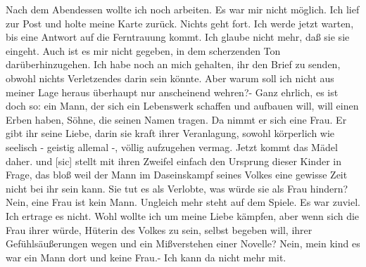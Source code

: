 \def\day{18 Mai 1944 18\begin{math}^{15}\end{math}}
\mktitle

Nach dem Abendessen wollte ich noch arbeiten.
Es war mir nicht m\"{o}glich.
Ich lief zur Post und holte meine Karte zur\"{u}ck.
Nichts geht fort.
Ich werde jetzt warten, bis eine Antwort auf die Ferntrauung kommt.
Ich glaube nicht mehr, da{\ss} sie sie eingeht.
Auch ist es mir nicht gegeben, in dem scherzenden Ton dar\"{u}berhinzugehen.
Ich habe noch an mich gehalten, ihr den Brief zu senden, obwohl nichts Verletzendes darin sein k\"{o}nnte.
Aber warum soll ich nicht aus meiner Lage heraus \"{u}berhaupt nur anscheinend wehren?-
Ganz ehrlich, es ist doch so: ein Mann, der sich ein Lebenswerk schaffen und aufbauen will, will einen Erben haben, S\"{o}hne, die seinen Namen tragen.
Da nimmt er sich eine Frau.
Er gibt ihr seine Liebe, darin sie kraft ihrer Veranlagung, sowohl k\"{o}rperlich wie seelisch - geistig allemal -, v\"{o}llig aufzugehen vermag.
Jetzt kommt das M\"{a}del daher.
und{\color{red} [sic] } stellt mit ihren Zweifel einfach den Ursprung dieser Kinder in Frage, das blo{\ss} weil der Mann im Daseinskampf seines Volkes eine gewisse Zeit nicht bei ihr sein kann.
Sie tut es als Verlobte, was w\"{u}rde sie als Frau hindern?
Nein, eine Frau ist kein Mann.
Ungleich mehr steht auf dem Spiele.
Es war zuviel.
Ich ertrage es nicht.
Wohl wollte ich um meine Liebe k\"{a}mpfen, aber wenn sich die Frau ihrer w\"{u}rde, H\"{u}terin des Volkes zu sein, selbst begeben will, ihrer Gef\"{u}hls\"{a}u{\ss}erungen wegen und ein Mi{\ss}verstehen einer Novelle?
Nein, mein kind es war ein Mann dort und keine Frau.-
Ich kann da nicht mehr mit.

\clearpage
